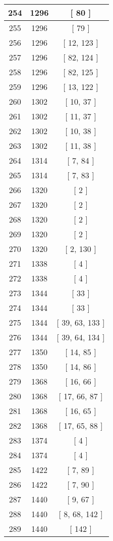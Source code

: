 \begin{center}
\begin{longtable}[H]{|| c c c ||}
254 & 1296 & [ 80 ] \\ 
\hline
255 & 1296 & [ 79 ] \\ 
\hline
256 & 1296 & [ 12, 123 ] \\ 
\hline
257 & 1296 & [ 82, 124 ] \\ 
\hline
258 & 1296 & [ 82, 125 ] \\ 
\hline
259 & 1296 & [ 13, 122 ] \\ 
\hline
260 & 1302 & [ 10, 37 ] \\ 
\hline
261 & 1302 & [ 11, 37 ] \\ 
\hline
262 & 1302 & [ 10, 38 ] \\ 
\hline
263 & 1302 & [ 11, 38 ] \\ 
\hline
264 & 1314 & [ 7, 84 ] \\ 
\hline
265 & 1314 & [ 7, 83 ] \\ 
\hline
266 & 1320 & [ 2 ] \\ 
\hline
267 & 1320 & [ 2 ] \\ 
\hline
268 & 1320 & [ 2 ] \\ 
\hline
269 & 1320 & [ 2 ] \\ 
\hline
270 & 1320 & [ 2, 130 ] \\ 
\hline
271 & 1338 & [ 4 ] \\ 
\hline
272 & 1338 & [ 4 ] \\ 
\hline
273 & 1344 & [ 33 ] \\ 
\hline
274 & 1344 & [ 33 ] \\ 
\hline
275 & 1344 & [ 39, 63, 133 ] \\ 
\hline
276 & 1344 & [ 39, 64, 134 ] \\ 
\hline
277 & 1350 & [ 14, 85 ] \\ 
\hline
278 & 1350 & [ 14, 86 ] \\ 
\hline
279 & 1368 & [ 16, 66 ] \\ 
\hline
280 & 1368 & [ 17, 66, 87 ] \\ 
\hline
281 & 1368 & [ 16, 65 ] \\ 
\hline
282 & 1368 & [ 17, 65, 88 ] \\ 
\hline
283 & 1374 & [ 4 ] \\ 
\hline
284 & 1374 & [ 4 ] \\ 
\hline
285 & 1422 & [ 7, 89 ] \\ 
\hline
286 & 1422 & [ 7, 90 ] \\ 
\hline
287 & 1440 & [ 9, 67 ] \\ 
\hline
288 & 1440 & [ 8, 68, 142 ] \\ 
\hline
289 & 1440 & [ 142 ] \\ 

\end{longtable}
\end{center}
